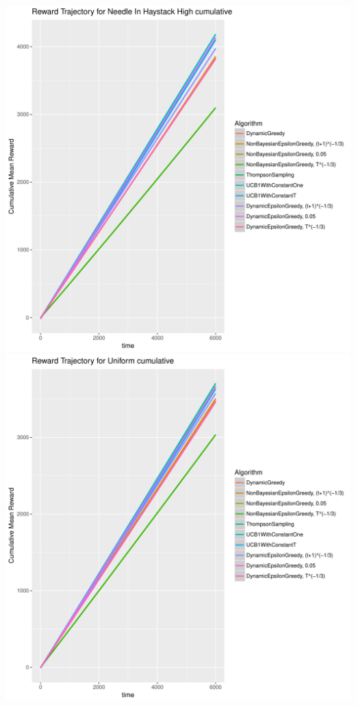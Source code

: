\documentclass[11pt,letterpaper]{article}
\begin{document}
\includegraphics[scale=0.5]{"../results/Reward Trajectory for Needle In Haystack High cumulative"} \\
\includegraphics[scale=0.5]{"../results/Reward Trajectory for Uniform cumulative"} \\
\end{document}
